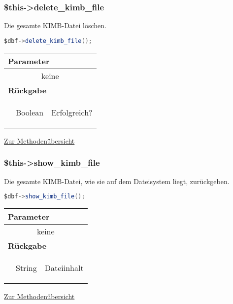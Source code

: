 \documentclass[paper=A4,pagesize=auto,12pt,headinclude=true,footinclude=true,BCOR=0mm,DIV=calc]{scrartcl}
\begin{document}
  
%  
  \subsubsection{\$this->delete\_kimb\_file}
  \label{sec:mth_fdel}
	    Die gesamte KIMB-Datei löschen. \\
	    \begin{lstlisting}[gobble=4,language=Java]
	      $dbf->delete_kimb_file();
	    \end{lstlisting}
	    
	     \begin{tabular}{|lcp{}|}
		    \hline
		      \multicolumn{3}{|l|}{ \textbf{Parameter} } \\
		    \hline
		      \multicolumn{3}{|c|}{ keine } \\
		    \hline
		      \multicolumn{3}{|l|}{ \textbf{Rückgabe} } \\
		    \hline
			     & Boolean & \begin{itshape} Erfolgreich? \end{itshape} \\
		    \hline
	    \end{tabular}
	    \begin{flushright} \small \hyperref[tab:methodenuerbersicht]{Zur Methodenübersicht} \end{flushright}

  \subsubsection{\$this->show\_kimb\_file}
  \label{sec:mth_fshow}
	    Die gesamte KIMB-Datei, wie sie auf dem Dateisystem liegt, zurückgeben.
	    \begin{lstlisting}[gobble=4,language=Java]
	      $dbf->show_kimb_file();
	    \end{lstlisting}
	    
	     \begin{tabular}{|lcp{}|}
		    \hline
		      \multicolumn{3}{|l|}{ \textbf{Parameter} } \\
		    \hline
		      \multicolumn{3}{|c|}{ keine } \\
		    \hline
		      \multicolumn{3}{|l|}{ \textbf{Rückgabe} } \\
		    \hline
			     & String & \begin{itshape} Dateiinhalt \end{itshape} \\
		    \hline
	    \end{tabular}
	    \begin{flushright} \small \hyperref[tab:methodenuerbersicht]{Zur Methodenübersicht} \end{flushright}
  
\end{document}
